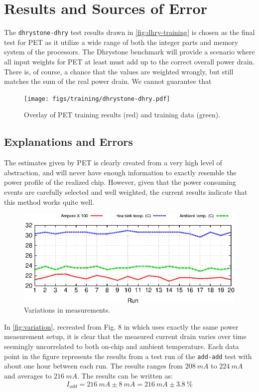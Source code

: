 \section{Results and Sources of Error}

The \texttt{dhrystone-dhry} test results drawn in \autoref{fig:dhry-training}
is chosen as the final test for PET as it utilize a wide range of both the
integer parts and memory system of the processors. The Dhrystone benchmark will
provide a scenario where all input weights for PET at least must add up to the correct
overall power drain. There is, of course, a chance that the values are weighted wrongly, but
still matches the sum of the real power drain. We cannot guarantee that 


\begin{figure}[ht]
\centering
\texttt{[image: figs/training/dhrystone-dhry.pdf]}
\caption{Overlay of PET training results (red) and training data (green).}
\label{fig:dhry-training}
\end{figure}

\subsection{Explanations and Errors}
The estimates given by PET is clearly created from a very high level of abstraction,
and will never have enough information to exactly resemble the power profile of
the realized chip. However, given that the power consuming events are carefully
selected and well weighted, the current results indicate that this method works quite well.

\begin{figure}[ht]
    \includegraphics{figs/heat}
    \caption{Variations in measurements.}
    \label{fig:variation}
\end{figure}

In \autoref{fig:variation}, recreated from Fig. 8 in \cite{rundehvatum2013exploring} which uses exactly the
same power measurement setup, it is clear that the measured current drain varies over
time seemingly uncorrelated to both on-chip and ambient temperature. Each data point
in the figure represents the results from a test run of the \texttt{add-add} test with
about one hour between each run. The results ranges from $208~mA$ to $224~mA$ and averages to $216~mA$.
The results can be written as:
\[I_{add} = 216~mA\pm8~mA = 216~mA\pm3.8~\%\]

